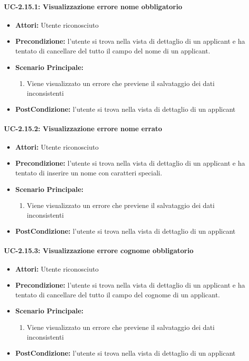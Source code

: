 \paragraph{UC-2.15.1: Visualizzazione errore nome obbligatorio}
\begin{itemize}	
	\item \textbf{Attori:} Utente riconosciuto
	\item \textbf{Precondizione:}  l'utente si trova nella vista di dettaglio di un applicant e ha tentato di cancellare del tutto il campo del nome di un applicant.
	\item \textbf{Scenario Principale:}
	\begin{enumerate}
		\item Viene visualizzato un errore che previene il salvataggio dei dati inconsistenti
	\end{enumerate}
	\item \textbf{PostCondizione:} l'utente si trova nella vista di dettaglio di un applicant
\end{itemize}

\paragraph{UC-2.15.2: Visualizzazione errore nome errato}
\begin{itemize}	
	\item \textbf{Attori:} Utente riconosciuto
	\item \textbf{Precondizione:}  l'utente si trova nella vista di dettaglio di un applicant e ha tentato di inserire un nome con caratteri speciali.
	\item \textbf{Scenario Principale:}
	\begin{enumerate}
		\item Viene visualizzato un errore che previene il salvataggio dei dati inconsistenti
	\end{enumerate}
	\item \textbf{PostCondizione:} l'utente si trova nella vista di dettaglio di un applicant
\end{itemize}

\paragraph{UC-2.15.3: Visualizzazione errore cognome obbligatorio}
\begin{itemize}	
	\item \textbf{Attori:} Utente riconosciuto
	\item \textbf{Precondizione:}  l'utente si trova nella vista di dettaglio di un applicant e ha tentato di cancellare del tutto il campo del cognome di un applicant.
	\item \textbf{Scenario Principale:}
	\begin{enumerate}
		\item Viene visualizzato un errore che previene il salvataggio dei dati inconsistenti
	\end{enumerate}
	\item \textbf{PostCondizione:} l'utente si trova nella vista di dettaglio di un applicant
\end{itemize}

